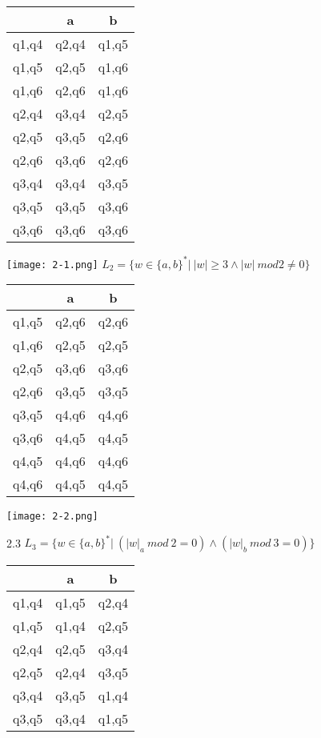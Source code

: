 \documentclass{article}
\begin{document}
\begin{tabular}{ | c | c | c | }
\hline
& a & b \\ \hline
q1,q4 & q2,q4 & q1,q5 \\ \hline
q1,q5 & q2,q5 & q1,q6 \\ \hline
q1,q6 & q2,q6 & q1,q6 \\ \hline
q2,q4 & q3,q4 & q2,q5 \\ \hline
q2,q5 & q3,q5 & q2,q6 \\ \hline
q2,q6 & q3,q6 & q2,q6 \\ \hline
q3,q4 & q3,q4 & q3,q5 \\ \hline
q3,q5 & q3,q5 & q3,q6 \\ \hline
q3,q6 & q3,q6 & q3,q6 \\
\hline
\end{tabular}

\texttt{[image: 2-1.png]}
 \(L_2 = \{w \in \{a,b\}^* |\ |w| \geq 3 \land |w| \ mod 2 \neq 0\}\)

\begin{tabular}{ | c | c | c | }
\hline
& a & b \\ \hline
q1,q5 & q2,q6 & q2,q6 \\ \hline
q1,q6 & q2,q5 & q2,q5 \\ \hline
q2,q5 & q3,q6 & q3,q6 \\ \hline
q2,q6 & q3,q5 & q3,q5 \\ \hline
q3,q5 & q4,q6 & q4,q6 \\ \hline
q3,q6 & q4,q5 & q4,q5 \\ \hline
q4,q5 & q4,q6 & q4,q6 \\ \hline
q4,q6 & q4,q5 & q4,q5 \\ \hline
\end{tabular}

\texttt{[image: 2-2.png]}
\newpage

2.3 \(L_3 = \{w \in \{a,b\}^* |\ (|w|_a\ mod \ 2 = 0) \land (|w|_b \ mod \ 3 = 0)\}\)

\begin{tabular}{ | c | c | c | }
\hline
& a & b \\ \hline
q1,q4 & q1,q5 & q2,q4 \\ \hline
q1,q5 & q1,q4 & q2,q5 \\ \hline
q2,q4 & q2,q5 & q3,q4 \\ \hline
q2,q5 & q2,q4 & q3,q5 \\ \hline
q3,q4 & q3,q5 & q1,q4 \\ \hline
q3,q5 & q3,q4 & q1,q5 \\ \hline
\end{tabular}
\end{document}
